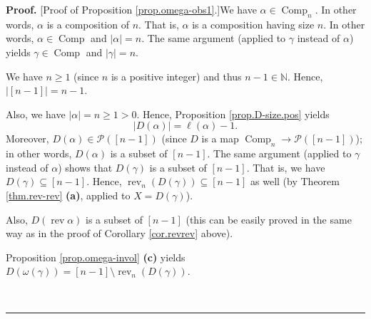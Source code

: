 \documentclass[numbers=enddot,12pt,final,onecolumn,notitlepage]{scrartcl}%
\theoremstyle{definition}
\newenvironment{proof}[1][Proof]{\noindent\textbf{#1.} }{\ \rule{0.5em}{0.5em}}
\begin{document}
\begin{proof}
[Proof of Proposition \ref{prop.omega-obs1}.]We have $\alpha\in
\operatorname*{Comp}\nolimits_{n}$. In other words, $\alpha$ is a composition
of $n$. That is, $\alpha$ is a composition having size $n$. In other words,
$\alpha\in\operatorname*{Comp}$ and $\left\vert \alpha\right\vert =n$. The
same argument (applied to $\gamma$ instead of $\alpha$) yields $\gamma
\in\operatorname*{Comp}$ and $\left\vert \gamma\right\vert =n$.

We have $n\geq1$ (since $n$ is a positive integer) and thus $n-1\in\mathbb{N}%
$. Hence, $\left\vert \left[  n-1\right]  \right\vert =n-1$.

Also, we have $\left\vert \alpha\right\vert =n\geq1>0$. Hence, Proposition
\ref{prop.D-size.pos} yields%
\begin{equation}
\left\vert D\left(  \alpha\right)  \right\vert =\ell\left(  \alpha\right)  -1.
\label{pf.prop.eta.S.Da}%
\end{equation}
Moreover, $D\left(  \alpha\right)  \in\mathcal{P}\left(  \left[  n-1\right]
\right)  $ (since $D$ is a map $\operatorname*{Comp}\nolimits_{n}%
\rightarrow\mathcal{P}\left(  \left[  n-1\right]  \right)  $); in other words,
$D\left(  \alpha\right)  $ is a subset of $\left[  n-1\right]  $. The same
argument (applied to $\gamma$ instead of $\alpha$) shows that $D\left(
\gamma\right)  $ is a subset of $\left[  n-1\right]  $. That is, we have
$D\left(  \gamma\right)  \subseteq\left[  n-1\right]  $. Hence,
$\operatorname*{rev}\nolimits_{n}\left(  D\left(  \gamma\right)  \right)
\subseteq\left[  n-1\right]  $ as well (by Theorem \ref{thm.rev-rev}
\textbf{(a)}, applied to $X=D\left(  \gamma\right)  $).

Also, $D\left(  \operatorname*{rev}\alpha\right)  $ is a subset of $\left[
n-1\right]  $ (this can be easily proved in the same way as in the proof of
Corollary \ref{cor.revrev} above).

Proposition \ref{prop.omega-invol} \textbf{(c)} yields $D\left(  \omega\left(
\gamma\right)  \right)  =\left[  n-1\right]  \setminus\operatorname*{rev}%
\nolimits_{n}\left(  D\left(  \gamma\right)  \right)  $.


\end{proof}
\end{document}
